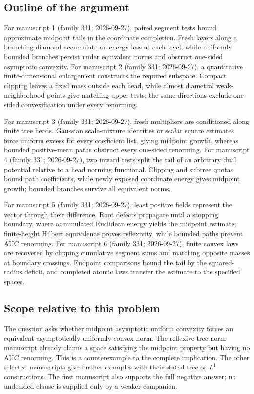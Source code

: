 \documentclass[11pt]{article}
\begin{document}
\subsection{Outline of the argument}
For manuscript 1 (family 331; 2026-09-27), paired segment tests bound approximate midpoint tails in the coordinate completion. Fresh layers along a branching diamond accumulate an energy loss at each level, while uniformly bounded branches persist under equivalent norms and obstruct one-sided asymptotic convexity. For manuscript 2 (family 331; 2026-09-27), a quantitative finite-dimensional enlargement constructs the required subspace. Compact clipping leaves a fixed mass outside each head, while almost diametral weak-neighborhood points give matching upper tests; the same directions exclude one-sided convexification under every renorming.

For manuscript 3 (family 331; 2026-09-27), fresh multipliers are conditioned along finite tree heads. Gaussian scale-mixture identities or scalar square estimates force uniform excess for every coefficient list, giving midpoint growth, whereas bounded positive-mean paths obstruct every one-sided renorming. For manuscript 4 (family 331; 2026-09-27), two inward tests split the tail of an arbitrary dual potential relative to a head norming functional. Clipping and subtree quotas bound path coefficients, while newly exposed coordinate energy gives midpoint growth; bounded branches survive all equivalent norms.

For manuscript 5 (family 331; 2026-09-27), least positive fields represent the vector through their difference. Root defects propagate until a stopping boundary, where accumulated Euclidean energy yields the midpoint estimate; finite-height Hilbert equivalence proves reflexivity, while bounded paths prevent AUC renorming. For manuscript 6 (family 331; 2026-09-27), finite convex laws are recovered by clipping cumulative segment sums and matching opposite masses at boundary crossings. Endpoint comparisons bound the tail by the squared-radius deficit, and completed atomic laws transfer the estimate to the specified spaces.

\subsection{Scope relative to this problem}
The question asks whether midpoint asymptotic uniform convexity forces an equivalent asymptotically uniformly convex norm. The reflexive tree-norm manuscript already claims a space satisfying the midpoint property but having no AUC renorming. This is a counterexample to the complete implication. The other selected manuscripts give further examples with their stated tree or $L^1$ constructions. The first manuscript also supports the full negative answer; no undecided clause is supplied only by a weaker companion.
\end{document}
